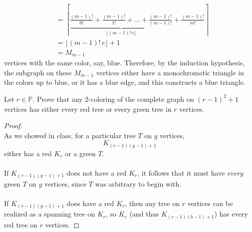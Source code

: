 \documentclass{article}
\newenvironment{problem}[2][Problem]{\begin{trivlist}
\item[\hskip \labelsep {\bfseries #1}\hskip \labelsep {\bfseries #2.}]}{\end{trivlist}}
\newenvironment{solution}[1][Solution.]{\begin{trivlist}
\item[\hskip \labelsep {\bfseries #1}]}{\end{trivlist}}
\begin{document}
\begin{solution}
\begin{enumerate}[(a)]
\begin{align*}
      &= \left\lceil
        \underbrace{
          \frac{(m-1)!}{0!} + \frac{(m-1)!}{1!} + \hdots + \frac{(m-1)!}{(m-1)!}
        }_{\lfloor (m-1)!\,e\rfloor}
        + \frac{(m-1)!}{m!}
      \right\rceil \\
      &= \lfloor (m-1)!\,e\rfloor + 1 \\
      &= M_{m-1}
    \end{align*} vertices with the same color, say, blue.
    Therefore, by the induction hypothesis, the subgraph on these $M_{m-1}$
    vertices either have a monochromatic triangle in the colors up to blue, or
    it has a blue edge, and this constructs a blue triangle.
  \end{enumerate}
\end{solution}
\pagebreak
\begin{problem}{3}
  Let $r \in \mathbb P$. Prove that any 2-coloring of the complete graph on
  $(r-1)^2 + 1$ vertices has either every red tree or every green tree in $r$
  vertices.
\end{problem}

\begin{proof} \text{} \\
  As we showed in class, for a particular tree $T$ on $g$ vertices, \[
    K_{(r-1)(g-1)+1}
  \] either has a red $K_r$ or a green $T$.
  \\~\\
  If $K_{(r-1)(g-1)+1}$ does not have
  a red $K_r$, it follows that it must have \textit{every} green $T$ on $g$
  vertices, since $T$ was arbitrary to begin with.
  \\~\\
  If $K_{(r-1)(g-1)+1}$ does have a red $K_r$, then any tree on $r$ vertices can
  be realized as a spanning tree on $K_r$, so $K_r$ (and thus $K_{(r-1)(b-1)+1}$)
  has every red tree on $r$ vertices.
\end{proof}
\end{document}

